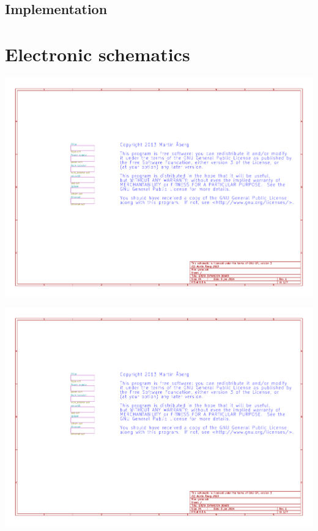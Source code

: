 \documentclass[a4paper]{report}
\begin{document}
\section{Implementation}

\appendix
\chapter{Electronic schematics}
\label{greta_sch} 
\begin{centering}
\includegraphics[width=\textwidth, page=1]{schematic.pdf}

\includegraphics[width=\textwidth, page=6]{schematic.pdf}


\end{centering}
\end{document}
